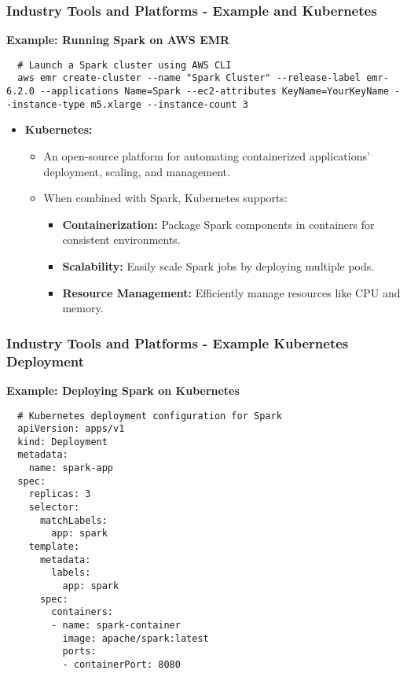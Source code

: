 \documentclass[aspectratio=169]{beamer}
\begin{document}
\begin{frame}[fragile]
  \frametitle{Industry Tools and Platforms - Example and Kubernetes}
  \textbf{Example: Running Spark on AWS EMR}
  \begin{lstlisting}
  # Launch a Spark cluster using AWS CLI
  aws emr create-cluster --name "Spark Cluster" --release-label emr-6.2.0 --applications Name=Spark --ec2-attributes KeyName=YourKeyName --instance-type m5.xlarge --instance-count 3
  \end{lstlisting}

  \begin{itemize}
    \item \textbf{Kubernetes:}
    \begin{itemize}
      \item An open-source platform for automating containerized applications' deployment, scaling, and management.
      \item When combined with Spark, Kubernetes supports:
      \begin{itemize}
        \item \textbf{Containerization:} Package Spark components in containers for consistent environments.
        \item \textbf{Scalability:} Easily scale Spark jobs by deploying multiple pods.
        \item \textbf{Resource Management:} Efficiently manage resources like CPU and memory.
      \end{itemize}
    \end{itemize}
  \end{itemize}
\end{frame}

\begin{frame}[fragile]
  \frametitle{Industry Tools and Platforms - Example Kubernetes Deployment}
  \textbf{Example: Deploying Spark on Kubernetes}
  \begin{lstlisting}
  # Kubernetes deployment configuration for Spark
  apiVersion: apps/v1
  kind: Deployment
  metadata:
    name: spark-app
  spec:
    replicas: 3
    selector:
      matchLabels:
        app: spark
    template:
      metadata:
        labels:
          app: spark
      spec:
        containers:
        - name: spark-container
          image: apache/spark:latest
          ports:
          - containerPort: 8080
  \end{lstlisting}
\end{frame}
\end{document}
